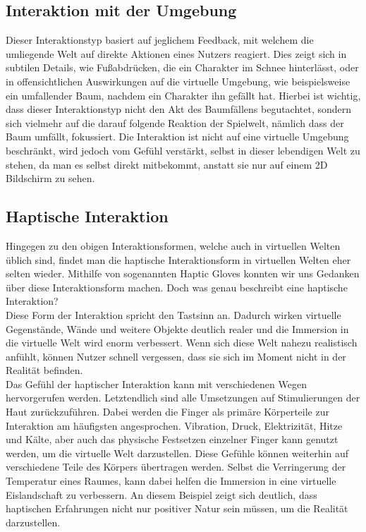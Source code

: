 \subsection{Interaktion mit der Umgebung}
Dieser Interaktionstyp basiert auf jeglichem Feedback, mit welchem die umliegende Welt auf direkte Aktionen eines Nutzers reagiert. Dies zeigt sich in subtilen Details, wie Fußabdrücken, die ein Charakter im Schnee hinterlässt, oder in offensichtlichen Auswirkungen auf die virtuelle Umgebung, wie beispielsweise ein umfallender Baum, nachdem ein Charakter ihn gefällt hat. Hierbei ist wichtig, dass dieser Interaktionstyp nicht den Akt des Baumfällens begutachtet, sondern sich vielmehr auf die darauf folgende Reaktion der Spielwelt, nämlich dass der Baum umfällt, fokussiert. Die Interaktion ist nicht auf eine virtuelle Umgebung beschränkt, wird jedoch vom Gefühl verstärkt, selbst in dieser lebendigen Welt zu stehen, da man es selbst direkt mitbekommt, anstatt sie nur auf einem 2D Bildschirm zu sehen.
\newpage
\noindent
\subsection{Haptische Interaktion}
Hingegen zu den obigen Interaktionsformen, welche auch in virtuellen Welten üblich sind, findet man die haptische Interaktionsform in virtuellen Welten eher selten wieder. Mithilfe von sogenannten Haptic Gloves konnten wir uns Gedanken über diese Interaktionsform machen. Doch was genau beschreibt eine haptische Interaktion?\\
Diese Form der Interaktion spricht den Tastsinn an. Dadurch wirken virtuelle Gegenstände, Wände und weitere Objekte deutlich realer und die Immersion in die virtuelle Welt wird enorm verbessert. Wenn sich diese Welt nahezu realistisch anfühlt, können Nutzer schnell vergessen, dass sie sich im Moment nicht in der Realität befinden.\\
Das Gefühl der haptischer Interaktion kann mit verschiedenen Wegen hervorgerufen werden. Letztendlich sind alle Umsetzungen auf Stimulierungen der Haut zurückzuführen. Dabei werden die Finger als primäre Körperteile zur Interaktion am häufigsten angesprochen. Vibration, Druck, Elektrizität, Hitze und Kälte, aber auch das physische Festsetzen einzelner Finger kann genutzt werden, um die virtuelle Welt darzustellen. Diese Gefühle können weiterhin auf verschiedene Teile des Körpers übertragen werden. Selbst die Verringerung der Temperatur eines Raumes, kann dabei helfen die Immersion in eine virtuelle Eislandschaft zu verbessern. An diesem Beispiel zeigt sich deutlich, dass haptischen Erfahrungen nicht nur positiver Natur sein müssen, um die Realität darzustellen.


